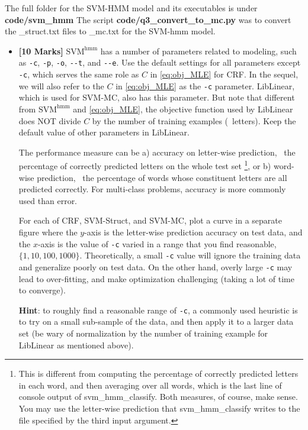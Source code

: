 \documentclass[11pt]{report}
\begin{document}
\textcolor{b}{The full folder for the SVM-HMM model and its executables is under \textbf{code/svm\_hmm} The script \textbf{code/q3\_convert\_to\_mc.py} was to convert the \_struct.txt files to \_mc.txt for the SVM-hmm model.}




\begin{itemize}
	\item[(3a)] {\bf [10 Marks]} $\text{SVM}^{\text{hmm}}$ has a number of parameters related to modeling, such as \verb#-c#, \verb#-p#, \verb#-o#, \verb#--t#, and \verb#--e#.
	Use the default settings for all parameters except \verb#-c#,
	which serves the same role as $C$ in \eqref{eq:obj_MLE} for CRF.
	In the sequel, we will also refer to the $C$ in \eqref{eq:obj_MLE} as the \verb#-c# parameter.
	LibLinear, which is used for SVM-MC, also has this parameter.
	But note that different from $\text{SVM}^{\text{hmm}}$ and \eqref{eq:obj_MLE}, the objective function used by LibLinear does NOT divide $C$ by the number of training examples (\ie\ letters).
	Keep the default value of other parameters in LibLinear.
	
	The performance measure can be a) accuracy on letter-wise prediction, \ie\ the percentage of correctly predicted letters on the whole test set%
	\footnote{This is different from computing the percentage of correctly predicted letters in each word, and then averaging over all words, which is the last line of console output of \textsf{svm\_hmm\_classify}.  Both measures, of course, make sense.
		You may use the letter-wise prediction that \textsf{svm\_hmm\_classify} writes to the file specified by the third input argument.},
	or b) word-wise prediction, \ie\ the percentage of words whose constituent letters are all predicted correctly.
	For multi-class problems, accuracy is more commonly used than error.
	
	For each of CRF, SVM-Struct, and SVM-MC,
	plot a curve in a separate figure where the $y$-axis is the letter-wise prediction accuracy on test data,
	and the $x$-axis is the value of \verb#-c# varied in a range that you find reasonable,
	\eg\ $\{1, 10, 100, 1000\}$.
	Theoretically, a small \verb#-c# value will ignore the training data and generalize poorly on test data.
	On the other hand, overly large \verb#-c# may lead to over-fitting, and make optimization challenging (taking a lot of time to converge).
	
	\textbf{Hint}: to roughly find a reasonable range of \verb#-c#, a commonly used heuristic is to try on a small sub-sample of the data, and then apply it to a larger data set (be wary of normalization by the number of training example for LibLinear as mentioned above).


\end{itemize}
\end{document}
